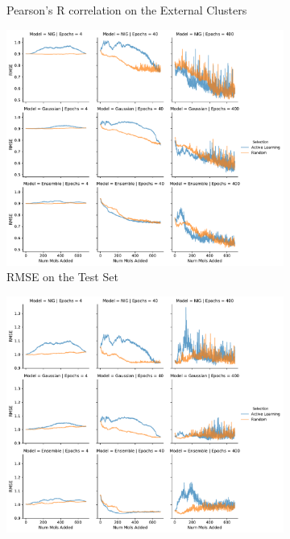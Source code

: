 \documentclass[journal=jmcmar,manuscript=article]{achemso}
\begin{document}
\begin{figure}[tbph]
\begin{subfigure}[b]{0.48\textwidth}
        \caption{Pearson's R correlation on the External Clusters}
    \end{subfigure}%
    \hfill
    \begin{subfigure}[b]{0.48\textwidth}
        \includegraphics[width=1\linewidth]{figures/fig6_MAT_input_RMSE.pdf}
        \caption{RMSE on the Test Set}
    \end{subfigure}%
    \hfill
    \begin{subfigure}[b]{0.48\textwidth}
        \includegraphics[width=1\linewidth]{figures/fig6_MAT_input_RMSE_rest.pdf}

\end{subfigure}
\end{figure}
\end{document}
